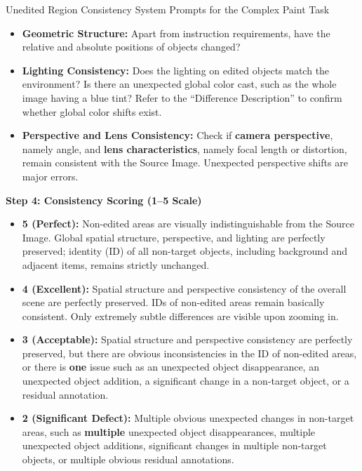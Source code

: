 \documentclass{llmxive}
\begin{document}
\begin{promptbox}[label={System Prompts: URC_Complex_paint}]{Unedited Region Consistency System Prompts for the Complex Paint Task}
\begin{itemize}[leftmargin=2.2em, labelsep=0.5em, itemsep=2pt]
    \begin{itemize}[leftmargin=2.2em, labelsep=0.5em, itemsep=2pt]
        \item \textbf{Geometric Structure:} Apart from instruction requirements, have the relative and absolute positions of objects changed?
        
        \item \textbf{Lighting Consistency:} Does the lighting on edited objects match the environment? Is there an unexpected global color cast, such as the whole image having a blue tint? Refer to the ``Difference Description'' to confirm whether global color shifts exist.
        
        \item \textbf{Perspective and Lens Consistency:} Check if \textbf{camera perspective}, namely angle, and \textbf{lens characteristics}, namely focal length or distortion, remain consistent with the Source Image. Unexpected perspective shifts are major errors.
    \end{itemize}
\end{itemize}

\medskip

\textbf{Step 4: Consistency Scoring (1--5 Scale)}

\begin{itemize}[leftmargin=2.2em, labelsep=0.5em, itemsep=2pt]
    \item \textbf{5 (Perfect):} Non-edited areas are visually indistinguishable from the Source Image. Global spatial structure, perspective, and lighting are perfectly preserved; identity (ID) of all non-target objects, including background and adjacent items, remains strictly unchanged.
    
    \item \textbf{4 (Excellent):} Spatial structure and perspective consistency of the overall scene are perfectly preserved. IDs of non-edited areas remain basically consistent. Only extremely subtle differences are visible upon zooming in.
    
    \item \textbf{3 (Acceptable):} Spatial structure and perspective consistency are perfectly preserved, but there are obvious inconsistencies in the ID of non-edited areas, or there is \textbf{one} issue such as an unexpected object disappearance, an unexpected object addition, a significant change in a non-target object, or a residual annotation.
    
    \item \textbf{2 (Significant Defect):} Multiple obvious unexpected changes in non-target areas, such as \textbf{multiple} unexpected object disappearances, multiple unexpected object additions, significant changes in multiple non-target objects, or multiple obvious residual annotations.
    

\end{itemize}
\end{promptbox}
\end{document}

